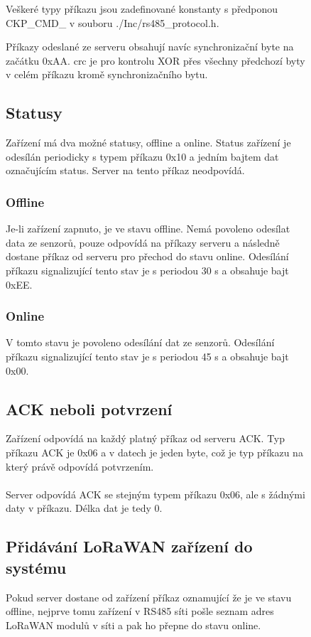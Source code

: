 \begin{figure}[!h]
Veškeré typy příkazu jsou zadefinované konstanty s předponou CKP\_CMD\_ v souboru ./Inc/rs485\_protocol.h.

Příkazy odeslané ze serveru obsahují navíc synchronizační byte na začátku 0xAA.
crc je pro kontrolu XOR přes všechny předchozí byty v celém příkazu kromě synchronizačního bytu.



\subsection{Statusy}
Zařízení má dva možné statusy, offline a online. Status zařízení je odesílán periodicky s typem příkazu 0x10 a jedním bajtem dat označujícím status. Server na tento příkaz neodpovídá.

\subsubsection{Offline}
Je-li zařízení zapnuto, je ve stavu offline. Nemá povoleno odesílat data ze senzorů, pouze odpovídá na příkazy serveru a následně dostane příkaz od serveru pro přechod do stavu online. Odesílání příkazu signalizující tento stav je s periodou 30 s a obsahuje bajt 0xEE.

\subsubsection{Online}
V tomto stavu je povoleno odesílání dat ze senzorů. Odesílání příkazu signalizující tento stav je s periodou 45 s a obsahuje bajt 0x00.

\subsection{ACK neboli potvrzení}
Zařízení odpovídá na každý platný příkaz od serveru ACK. Typ příkazu ACK je 0x06 a v datech je jeden byte, což je typ příkazu na který právě odpovídá potvrzením.
\\ \\
Server odpovídá ACK se stejným typem příkazu 0x06, ale s žádnými daty v příkazu. Délka dat je tedy 0.

\subsection{Přidávání LoRaWAN zařízení do systému}
Pokud server dostane od zařízení příkaz oznamující že je ve stavu offline, nejprve tomu zařízení v RS485 síti pošle seznam adres LoRaWAN modulů v síti a pak ho přepne do stavu online.


\end{figure}
